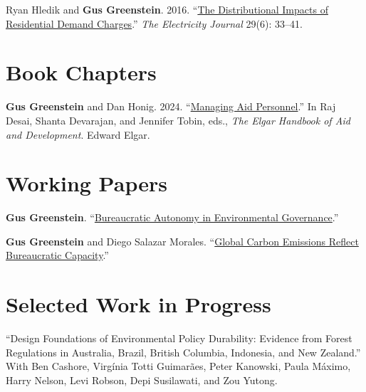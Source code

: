 \documentclass[11pt, letterpaper]{article}
\begin{document}
\vspace{0.5em}

Ryan Hledik and \textbf{Gus Greenstein}. 2016. ``\href{https://www.gusgreenstein.com/uploads/1/3/7/2/137261035/2016_--_hledik_and_greenstein_--_the_electricity_journal_--_the_distributional_impacts_of_residential_demand_charges.pdf}{The Distributional Impacts of Residential Demand Charges}.'' \textit{The Electricity Journal} 29(6): 33--41.

\section{Book Chapters}

\textbf{Gus Greenstein} and Dan Honig. 2024. ``\href{https://www.gusgreenstein.com/uploads/1/3/7/2/137261035/2024_--_greenstein_and_honig_--_ch._18-_managing_aid_personnel.pdf}{Managing Aid Personnel}.'' In Raj Desai, Shanta Devarajan, and Jennifer Tobin, eds., \textit{The Elgar Handbook of Aid and Development}. Edward Elgar.

\section{Working Papers}

\textbf{Gus Greenstein}. ``\href{https://papers.ssrn.com/sol3/papers.cfm?abstract_id=5183425}{Bureaucratic Autonomy in Environmental Governance}.''

\vspace{0.5em}

\textbf{Gus Greenstein} and Diego Salazar Morales. ``\href{https://papers.ssrn.com/sol3/papers.cfm?abstract_id=7117961}{Global Carbon Emissions Reflect Bureaucratic Capacity}.''

\section{Selected Work in Progress}

``Design Foundations of Environmental Policy Durability: Evidence from Forest Regulations in Australia, Brazil, British Columbia, Indonesia, and New Zealand.'' With Ben Cashore, Virg\'inia Totti Guimar\~aes, Peter Kanowski, Paula M\'aximo, Harry Nelson, Levi Robson, Depi Susilawati, and Zou Yutong.
\end{document}

